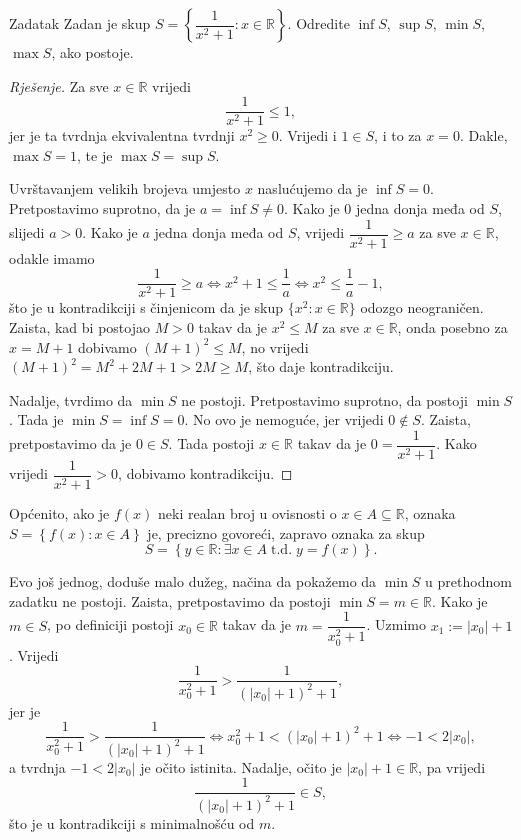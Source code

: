\begin{exercise}{Zadatak}
\label{supinffirst}
Zadan je skup \(S=\left\{\dfrac{1}{x^2+1} : x\in \mathbb{R}\right\}\). Odredite $\inf{S}$, $\sup{S}$, $\min{S}$, $\max{S}$, ako postoje.
\end{exercise}
\begin{proof}[Rješenje]
Za sve \(x\in \mathbb{R}\) vrijedi \[\dfrac{1}{x^2+1}\leq 1,\] jer je ta tvrdnja ekvivalentna tvrdnji \(x^2\geq 0\). Vrijedi i \(1\in S\), i to za \(x=0\). Dakle, \(\max{S}=1\), te je \(\max{S}=\sup{S}\).

Uvrštavanjem velikih brojeva umjesto \(x\) naslućujemo da je \(\inf{S}=0\). Pretpostavimo suprotno, da je \(a=\inf{S}\neq 0\). Kako je \(0\) jedna donja međa od \(S\), slijedi \(a>0\). Kako je \(a\) jedna donja međa od \(S\), vrijedi \(\dfrac{1}{x^2+1}\geq a\) za sve \(x\in \mathbb{R}\), odakle imamo
\[\dfrac{1}{x^2+1}\geq a\Leftrightarrow x^2+1\leq \dfrac{1}{a}\Leftrightarrow x^2\leq \dfrac{1}{a}-1,\]
što je u kontradikciji s činjenicom da je skup \(\{x^2 : x\in \mathbb{R}\}\) odozgo neograničen. Zaista, kad bi postojao $M>0$ takav da je $x^2\leq M$ za sve $x\in \mathbb{R}$, onda posebno za $x=M+1$ dobivamo $(M+1)^2\leq M$, no vrijedi $(M+1)^2=M^2+2M+1>2M\geq M$, što daje kontradikciju.

Nadalje, tvrdimo da \(\min{S}\) ne postoji. Pretpostavimo suprotno, da postoji \(\min{S}\). Tada je \(\min{S}=\inf{S}=0\). No ovo je nemoguće, jer vrijedi \(0\notin S\). Zaista, pretpostavimo da je \(0\in S\). Tada postoji \(x\in \mathbb{R}\) takav da je \(0=\dfrac{1}{x^2+1}\). Kako vrijedi \(\dfrac{1}{x^2+1}>0\), dobivamo kontradikciju.
\end{proof}
\begin{remark}
\label{usefulnotation}
Općenito, ako je \(f(x)\) neki realan broj u ovisnosti o \(x\in A\subseteq \mathbb{R}\), oznaka \(S=\left\{f(x) : x\in A\right\}\) je, precizno govoreći, zapravo oznaka za skup \[S=\left\{y\in \mathbb{R} : \exists x\in A \;\mathrm{t.d.}\; y=f(x)\right\}.\]
\end{remark}
\begin{remark}
Evo još jednog, doduše malo dužeg, načina da pokažemo da \(\min{S}\) u prethodnom zadatku ne postoji. Zaista, pretpostavimo da postoji \(\min{S}=m\in \mathbb{R}\). Kako je \(m\in S\), po definiciji postoji \(x_0\in \mathbb{R}\) takav da je \(m=\dfrac{1}{x_0^2+1}\). Uzmimo \(x_1:=|x_0|+1\). Vrijedi \[\dfrac{1}{x_0^2+1}> \dfrac{1}{(|x_0|+1)^2+1},\]
jer je
\[\dfrac{1}{x_0^2+1}> \dfrac{1}{(|x_0|+1)^2+1}\Leftrightarrow x_0^2+1<(|x_0|+1)^2+1\Leftrightarrow -1<2|x_0|,\]
a tvrdnja \(-1<2|x_0|\) je očito istinita. Nadalje, očito je \(|x_0|+1\in \mathbb{R}\), pa vrijedi \[\dfrac{1}{(|x_0|+1)^2+1}\in S,\] što je u kontradikciji s minimalnošću od \(m\).
\end{remark}
